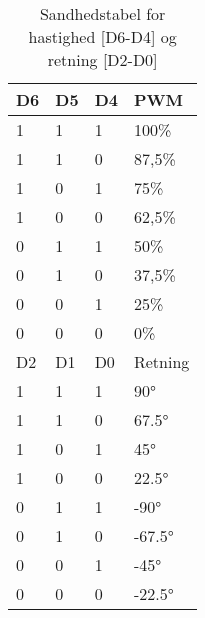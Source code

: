 \begin{table}[!h]
\centering\small 
\caption{Sandhedstabel for hastighed [D6-D4] og retning [D2-D0]}
\label{tab:protokol:truthtable}
\begin{tabular}{@{}llll@{}}\toprule
D6 & D5 & D4 & PWM    \\\midrule
1  & 1  & 1  & 100\%  \\
1  & 1  & 0  & 87,5\% \\
1  & 0  & 1  & 75\%   \\
1  & 0  & 0  & 62,5\% \\
0  & 1  & 1  & 50\%   \\
0  & 1  & 0  & 37,5\% \\
0  & 0  & 1  & 25\%   \\
0  & 0  & 0  & 0\%   \\\midrule
D2 & D1 & D0 & Retning \\\midrule
1  & 1  & 1  & \ang{90}      \\
1  & 1  & 0  & \ang{67.5}    \\
1  & 0  & 1  & \ang{45}      \\
1  & 0  & 0  & \ang{22.5}    \\
0  & 1  & 1  & \ang{-90}     \\
0  & 1  & 0  & \ang{-67.5}   \\
0  & 0  & 1  & \ang{-45}     \\
0  & 0  & 0  & \ang{-22.5}   \\\bottomrule
\end{tabular}%
\end{table}

